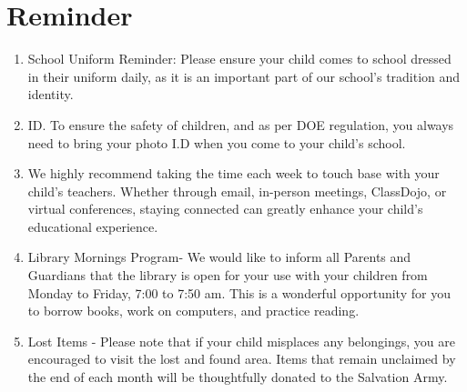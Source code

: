 \documentclass[11pt]{article}
\begin{document}
\section{Reminder}
\label{sec:orgeed60c0}
\begin{enumerate}
\item School Uniform Reminder: Please ensure your child comes to school dressed in their uniform daily, as it is an important part of our school's tradition and identity.
\item ID. To ensure the safety of children, and as per DOE regulation, you always need to bring your photo I.D when you come to your child’s school.
\item We highly recommend taking the time each week to touch base with your child's teachers. Whether through email, in-person meetings, ClassDojo, or virtual conferences, staying connected can greatly enhance your child's educational experience.
\item Library Mornings Program- We would like to inform all Parents and Guardians that the library is open for your use with your children from Monday to Friday, 7:00 to 7:50 am. This is a wonderful opportunity for you to borrow books, work on computers, and practice reading.
\item Lost Items - Please note that if your child misplaces any belongings, you are encouraged to visit the lost and found area. Items that remain unclaimed by the end of each month will be thoughtfully donated to the Salvation Army.
\end{enumerate}
\end{document}

